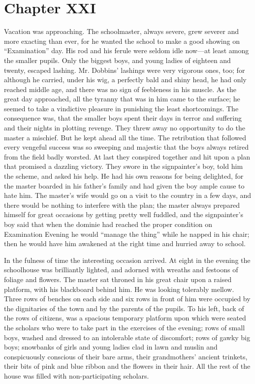\documentclass{book}
\begin{document}
\chapter*{Chapter XXI}

Vacation was approaching. The schoolmaster, always severe, grew severer and more exacting than ever, for he wanted the school to make a good showing on “Examination” day. His rod and his ferule were seldom idle now—at least among the smaller pupils. Only the biggest boys, and young ladies of eighteen and twenty, escaped lashing. Mr. Dobbins’ lashings were very vigorous ones, too; for although he carried, under his wig, a perfectly bald and shiny head, he had only reached middle age, and there was no sign of feebleness in his muscle. As the great day approached, all the tyranny that was in him came to the surface; he seemed to take a vindictive pleasure in punishing the least shortcomings. The consequence was, that the smaller boys spent their days in terror and suffering and their nights in plotting revenge. They threw away no opportunity to do the master a mischief. But he kept ahead all the time. The retribution that followed every vengeful success was so sweeping and majestic that the boys always retired from the field badly worsted. At last they conspired together and hit upon a plan that promised a dazzling victory. They swore in the signpainter’s boy, told him the scheme, and asked his help. He had his own reasons for being delighted, for the master boarded in his father’s family and had given the boy ample cause to hate him. The master’s wife would go on a visit to the country in a few days, and there would be nothing to interfere with the plan; the master always prepared himself for great occasions by getting pretty well fuddled, and the signpainter’s boy said that when the dominie had reached the proper condition on Examination Evening he would “manage the thing” while he napped in his chair; then he would have him awakened at the right time and hurried away to school.

In the fulness of time the interesting occasion arrived. At eight in the evening the schoolhouse was brilliantly lighted, and adorned with wreaths and festoons of foliage and flowers. The master sat throned in his great chair upon a raised platform, with his blackboard behind him. He was looking tolerably mellow. Three rows of benches on each side and six rows in front of him were occupied by the dignitaries of the town and by the parents of the pupils. To his left, back of the rows of citizens, was a spacious temporary platform upon which were seated the scholars who were to take part in the exercises of the evening; rows of small boys, washed and dressed to an intolerable state of discomfort; rows of gawky big boys; snowbanks of girls and young ladies clad in lawn and muslin and conspicuously conscious of their bare arms, their grandmothers’ ancient trinkets, their bits of pink and blue ribbon and the flowers in their hair. All the rest of the house was filled with non-participating scholars.
\end{document}
